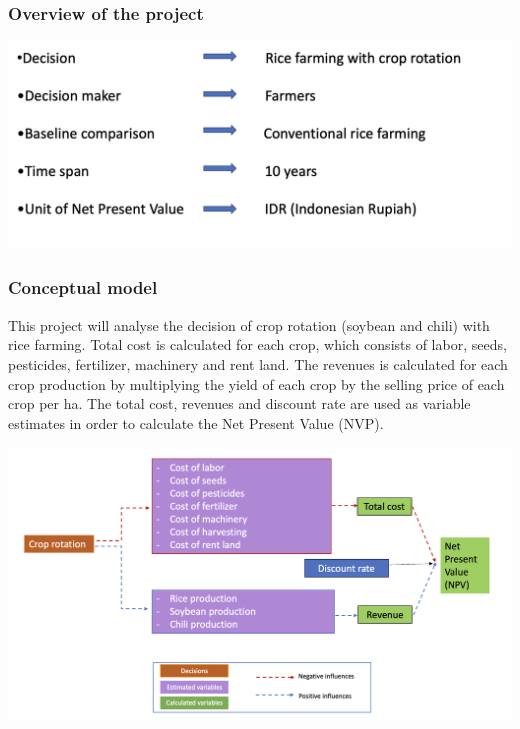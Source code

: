 \documentclass[
]{article}
\begin{document}
\hypertarget{overview-of-the-project}{%
\subsubsection{Overview of the project}\label{overview-of-the-project}}

\includegraphics{Photo rice farm with crop rotation/overview of the project.png}

\hypertarget{conceptual-model}{%
\subsubsection{Conceptual model}\label{conceptual-model}}

This project will analyse the decision of crop rotation (soybean and
chili) with rice farming. Total cost is calculated for each crop, which
consists of labor, seeds, pesticides, fertilizer, machinery and rent
land. The revenues is calculated for each crop production by multiplying
the yield of each crop by the selling price of each crop per ha. The
total cost, revenues and discount rate are used as variable estimates in
order to calculate the Net Present Value (NVP).

\includegraphics{Photo rice farm with crop rotation/conceptual model.png}
\end{document}
